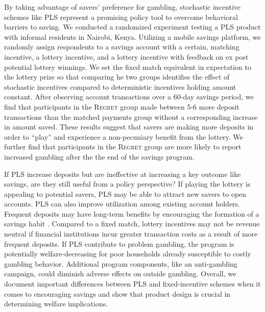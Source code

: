\documentclass[12pt]{article}
\begin{document}
		By taking advantage of savers' preference for gambling, stochastic incentive schemes like PLS represent a promising policy tool to overcome behavioral barriers to saving. We conducted a randomized experiment testing a PLS product with informal residents in Nairobi, Kenya. Utilizing a mobile savings platform, we randomly assign respondents to a savings account with a certain, matching incentive, a lottery incentive, and a lottery incentive with feedback on ex post potential lottery winnings. We set the fixed match equivalent in expectation to the lottery prize so that comparing he two groups identifies the effect of stochastic incentives compared to deterministic incentives holding amount constant. After observing account transactions over a 60-day savings period, we find that participants in the \textsc{Regret} group made between 5-6 more deposit transactions than the matched payments group without a corresponding increase in amount saved. These results suggest that savers are making more deposits in order to ``play'' and experience a non-pecuniary benefit from the lottery. We further find that participants in the \textsc{Regret} group are more likely to report increased gambling after the the end of the savings program.

		If PLS increase deposits but are ineffective at increasing a key outcome like savings, are they still useful from a policy perspective? If playing the lottery is appealing to potential savers, PLS may be able to attract new savers to open  accounts. PLS can also improve utilization among existing account holders. Frequent deposits may have long-term benefits by encouraging the formation of a savings habit . Compared to a fixed match, lottery incentives may not be revenue neutral if financial institutions incur greater transaction costs as a result of more frequent deposits. If PLS contribute to problem gambling, the program is potentially welfare-decreasing for poor households already susceptible to costly gambling behavior. Additional program components, like an anti-gambling campaign, could diminish adverse effects on outside gambling. Overall, we document important differences between PLS and fixed-incentive schemes when it comes to encouraging savings and show that product design is crucial in determining welfare implications.
\end{document}
